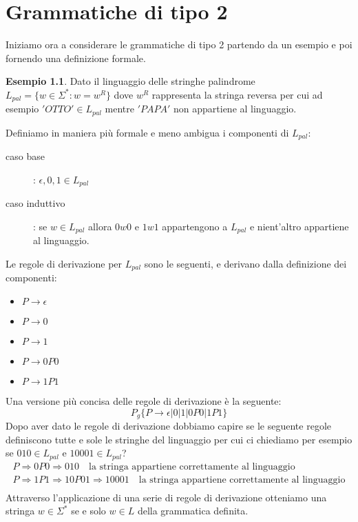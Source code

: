 \documentclass[a4paper]{book}
\theoremstyle{definition}%
\newtheorem*{esempio}{Esempio}
\begin{document}
\chapter{Grammatiche di tipo 2}
Iniziamo ora a considerare le grammatiche di tipo 2 partendo da un esempio e poi fornendo una definizione formale.
\begin{esempio}
  Dato il linguaggio delle stringhe palindrome $L _{pal} = \{w \in \Sigma ^ * : w = w ^ R\}$ dove $w^R$ rappresenta la stringa
  reversa per cui ad esempio $'OTTO' \in L_{pal}$ mentre $'PAPA'$ non appartiene al linguaggio.

  Definiamo in maniera più formale e meno ambigua i componenti di $L_{pal}$:
  \begin{description}
  \item [caso base]: $\epsilon, 0, 1 \in L_{pal}$
  \item [caso induttivo]: se $w \in L_{pal}$ allora $0w0$ e $1w1$ appartengono a $L_{pal}$ e nient'altro appartiene al linguaggio.
  \end{description}
  Le regole di derivazione per $L_{pal}$ sono le seguenti, e derivano dalla definizione dei componenti:
  \begin{itemize}
  \item $P \to \epsilon$
  \item $P \to 0$
  \item $P \to 1$
  \item $P \to 0P0$
  \item $P \to 1P1$
  \end{itemize}
  Una versione più concisa delle regole di derivazione è la seguente:
  \[ P_g\{P \to \epsilon | 0 | 1 | 0P0 | 1P1\} \]
  Dopo aver dato le regole di derivazione dobbiamo capire se le seguente regole definiscono tutte e sole le stringhe del linguaggio per
  cui ci chiediamo per esempio se $010 \in L_{pal}$ e $10001 \in L_{pal}$?
  \begin{align}
    P \Rightarrow 0P0 \Rightarrow 010  \quad \text{la stringa appartiene correttamente al linguaggio}\\
    P \Rightarrow 1P1 \Rightarrow 10P01 \Rightarrow 10001 \quad \text{la stringa appartiene correttamente al linguaggio}\\
  \end{align}
  Attraverso l'applicazione di una serie di regole di derivazione otteniamo una stringa $w \in \Sigma ^*$ se e solo $w \in L$
  della grammatica definita.
\end{esempio}
\end{document}
